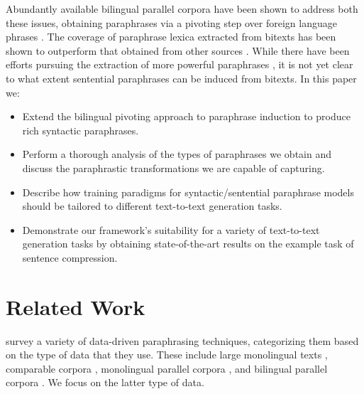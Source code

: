 \documentclass[11pt]{article}
\begin{document}
Abundantly available bilingual parallel corpora have been shown to
address both these issues, obtaining paraphrases via a pivoting step
over foreign language phrases \cite{Callison-Burch2005}. The coverage
of paraphrase lexica extracted from bitexts has been shown to
outperform that obtained from other sources \cite{Zhao2008b}. While
there have been efforts pursuing the extraction of more powerful
paraphrases
\cite{Madnani2007,Callison-Burch2008,cohn-lapata:2008,Zhao2008}, it is
not yet clear to what extent sentential paraphrases can be induced
from bitexts. In this paper we:
\begin{itemize}
\item Extend the bilingual pivoting approach to paraphrase induction
  to produce rich syntactic paraphrases.
\item Perform a thorough analysis of the types of paraphrases we
  obtain and discuss the paraphrastic transformations we are capable
  of capturing.
\item Describe how training paradigms for
  syntactic/sentential paraphrase models should be tailored to
  different text-to-text generation tasks.
\item Demonstrate our framework's suitability for a variety of
  text-to-text generation tasks by obtaining state-of-the-art results
  on the example task of sentence compression.
\end{itemize}


\section{Related Work} \label{related_work}

 survey a variety of data-driven paraphrasing
techniques, categorizing them based on the type of data that they use.
These include large monolingual texts
\cite{Lin2001,szpektor-EtAl:2004:EMNLP,Bhagat2008}, comparable corpora
\cite{Barzilay2003,Dolan2004}, monolingual parallel corpora
\cite{Barzilay2001,Pang2003}, and bilingual parallel corpora
\cite{Callison-Burch2005,Madnani2007,Zhao2008}.  We focus on the
latter type of data.
\end{document}
